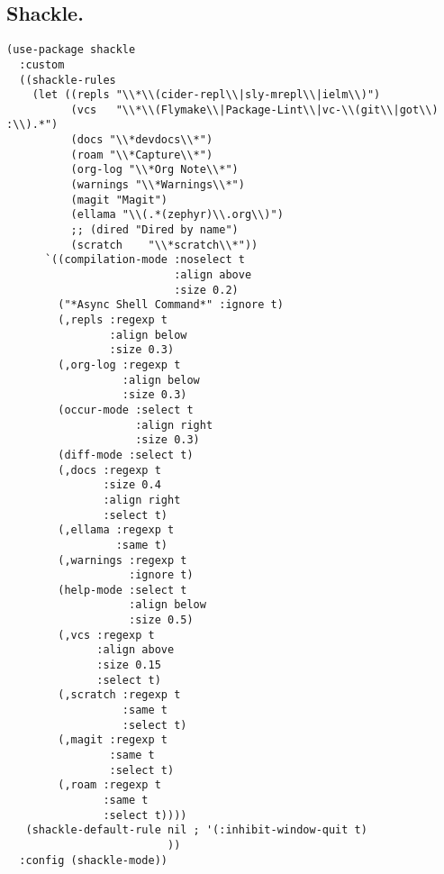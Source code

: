 \documentclass[11pt]{article}
\begin{document}
\subsection{Shackle.}
\label{sec:org0faa4ae}
\begin{verbatim}
(use-package shackle
  :custom
  ((shackle-rules
    (let ((repls "\\*\\(cider-repl\\|sly-mrepl\\|ielm\\)")
          (vcs   "\\*\\(Flymake\\|Package-Lint\\|vc-\\(git\\|got\\) :\\).*")
          (docs "\\*devdocs\\*")
          (roam "\\*Capture\\*")
          (org-log "\\*Org Note\\*")
          (warnings "\\*Warnings\\*")
          (magit "Magit")
          (ellama "\\(.*(zephyr)\\.org\\)")
          ;; (dired "Dired by name")
          (scratch    "\\*scratch\\*"))
      `((compilation-mode :noselect t
                          :align above
                          :size 0.2)
        ("*Async Shell Command*" :ignore t)
        (,repls :regexp t
                :align below
                :size 0.3)
        (,org-log :regexp t
                  :align below
                  :size 0.3)
        (occur-mode :select t
                    :align right
                    :size 0.3)
        (diff-mode :select t)
        (,docs :regexp t
               :size 0.4
               :align right
               :select t)
        (,ellama :regexp t
                 :same t)
        (,warnings :regexp t
                   :ignore t)
        (help-mode :select t
                   :align below
                   :size 0.5)
        (,vcs :regexp t
              :align above
              :size 0.15
              :select t)
        (,scratch :regexp t 
                  :same t
                  :select t)
        (,magit :regexp t 
                :same t
                :select t)
        (,roam :regexp t 
               :same t
               :select t))))
   (shackle-default-rule nil ; '(:inhibit-window-quit t)
                         ))
  :config (shackle-mode))
\end{verbatim}
\end{document}
